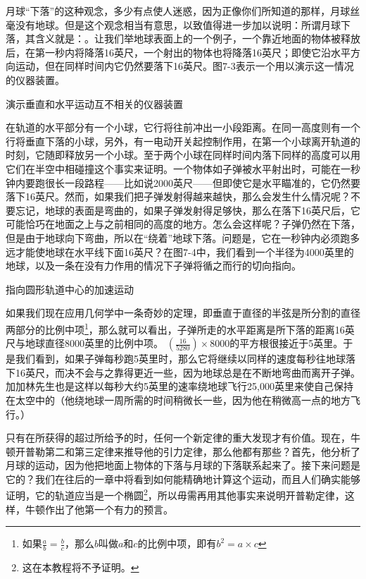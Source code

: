\documentclass[12pt,oneside]{book}
\begin{document}
\begin{common-format}
月球“下落”的这种观念，多少有点使人迷惑，因为正像你们所知道的那样，月球丝毫没有地球。但是这个观念相当有意思，以致值得进一步加以说明：所谓月球下落，其含义就是：。让我们举地球表面上的一个例子，一个靠近地面的物体被释放后，在第一秒内将降落16英尺，一个射出的物体也将降落16英尺；即使它沿水平方向运动，但在同样时间内它仍然要落下16英尺。图7-3表示一个用以演示这一情况的仪器装置。
\begin{fig}{演示垂直和水平运动互不相关的仪器装置}
\caption{\footnotesize 演示垂直和水平运动互不相关的仪器装置}
\label{fig:演示垂直和水平运动互不相关的仪器装置}
\end{fig}
在轨道的水平部分有一个小球，它行将往前冲出一小段距离。在同一高度则有一个行将垂直下落的小球，另外，有一电动开关起控制作用，在第一个小球离开轨道的时刻，它随即释放另一个小球。至于两个小球在同样时间内落下同样的高度可以用它们在半空中相碰撞这个事实来证明。一个物体如子弹被水平射出时，可能在一秒钟内要跑很长一段路程——比如说2000英尺——但即使它是水平瞄准的，它仍然要落下16英尺。然而，如果我们把子弹发射得越来越快，那么会发生什么情况呢？不要忘记，地球的表面是弯曲的，如果子弹发射得足够快，那么在落下16英尺后，它可能恰巧在地面之上与之前相同的高度的地方。怎么会这样呢？子弹仍然在下落，但是由于地球向下弯曲，所以在“绕着”地球下落。问题是，它在一秒钟内必须跑多远才能使地球在水平线下面16英尺？在图7-4中，我们看到一个半径为4000英里的地球，以及一条在没有力作用的情况下子弹将循之而行的切向指向。
\begin{fig}{指向圆形轨道中心的加速运动}
\caption{\footnotesize 指向圆形轨道中心的加速运动。根据平面几何，$x/S=(2R-S)/x\approx 2R/x$，其中$R$是地球的半径（4000英里），$x$是每秒“水平通过”的距离；$S$是每秒“下落”的距离（16英尺）}
\label{fig:指向圆形轨道中心的加速运动}
\end{fig}
如果我们现在应用几何学中一条奇妙的定理，即垂直于直径的半弦是所分割的直径两部分的比例中项\footnote{如果$\frac{a}{b}=\frac{b}{c}$，那么$b$叫做$a$和$c$的比例中项，即有$b^2=a \times c$}，那么就可以看出，子弹所走的水平距离是所下落的距离16英尺与地球直径8000英里的比例中项。
$(\frac{16}{5280})\times 8000$的平方根很接近于5英里。于是我们看到，如果子弹每秒跑5英里时，那么它将继续以同样的速度每秒往地球落下16英尺，而决不会与之靠得更近一些，因为地球总是在不断地弯曲而离开子弹。加加林先生也是这样以每秒大约5英里的速率绕地球飞行25,000英里来使自己保持在太空中的（他绕地球一周所需的时间稍微长一些，因为他在稍微高一点的地方飞行。）

只有在所获得的超过所给予的时，任何一个新定律的重大发现才有价值。现在，牛顿开普勒第二和第三定律来推导他的引力定律，那么他都有那些？首先，他分析了月球的运动，因为他把地面上物体的下落与月球的下落联系起来了。接下来问题是它的？我们在往后的一章中将看到如何能精确地计算这个运动，而且人们确实能够证明，它的轨道应当是一个椭圆\footnote{这在本教程将不予证明。}，所以毋需再用其他事实来说明开普勒定律，这样，牛顿作出了他第一个有力的预言。


\end{common-format}
\end{document}
